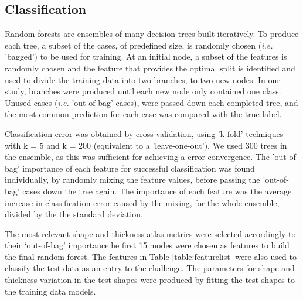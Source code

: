 \documentclass{llncs}
\begin{document}
	
	\subsection{Classification}

\label{method:classification}

 

Random forests are ensembles of many decision trees built iteratively. To produce each tree, a subset of the cases, of predefined size, is randomly chosen (\emph{i.e.} 'bagged') to be used for training. At an initial node, a subset of the features is randomly chosen and the feature that provides the optimal split is identified and used to divide the training data into two branches, to two new nodes. In our study, branches were produced until each new node only contained one class. Unused cases (\emph{i.e.} 'out-of-bag' cases), were passed down each completed tree, and the most common prediction for each case was compared with the true label.

Classification error was obtained by cross-validation, using 'k-fold' techniques with k = 5 and k = 200 (equivalent to a 'leave-one-out'). We used 300 trees in the ensemble, as this was sufficient for achieving a error convergence. The 'out-of-bag' importance of each feature for successful classification was found individually, by randomly mixing the feature values, before passing the 'out-of-bag' cases down the tree again. The importance of each feature was the average increase in classification error caused by the mixing, for the whole ensemble, divided by the the standard deviation.

The most relevant shape and thickness atlas metrics were selected accordingly to their ‘out-of-bag’ importance:he first 15 modes were chosen as features to build the final random forest. The features in Table \ref{table:featurelist} were also used to classify the test data as an entry to the challenge. The parameters for shape and thickness variation in the test shapes were produced by fitting the test shapes to the training data models.
\end{document}
